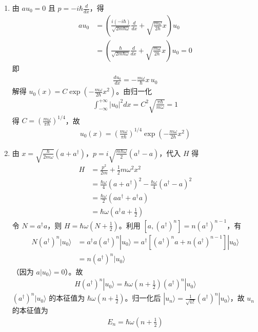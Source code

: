 \begin{enumerate}
{\begin{enumerate}
		\item 由 $a u_0=0$ 且 $p=-i\hbar\frac{d}{dx}$，得
		\begin{align*}
			a u_0&=\left(\frac{i(-i\hbar)}{\sqrt{2m\hbar\omega}}\frac{d}{dx}+\sqrt{\frac{m\omega}{2\hbar}}x\right)u_0\\
			&=\left(\frac{\hbar}{\sqrt{2m\hbar\omega}}\frac{d}{dx}+\sqrt{\frac{m\omega}{2\hbar}}x\right)u_0=0
		\end{align*}
		即
		\begin{align*}
			\frac{du_0}{dx}=-\frac{m\omega}{\hbar}x\,u_0
		\end{align*}
		解得 $u_0(x)=C\exp\!\left(-\frac{m\omega}{2\hbar}x^2\right)$。由归一化
		\begin{align*}
			\int_{-\infty}^{+\infty}|u_0|^2dx=C^2\sqrt{\frac{\pi\hbar}{m\omega}}=1
		\end{align*}
		得 $C=\left(\frac{m\omega}{\pi\hbar}\right)^{1/4}$，故
		\begin{align*}
			u_0(x)=\left(\frac{m\omega}{\pi\hbar}\right)^{1/4}\exp\!\left(-\frac{m\omega}{2\hbar}x^2\right)
		\end{align*}
		
		\item 由 $x=\sqrt{\frac{\hbar}{2m\omega}}(a+a^{\dagger})$，$p=i\sqrt{\frac{m\hbar\omega}{2}}(a^{\dagger}-a)$，代入 $H$ 得
		\begin{align*}
			H&=\frac{p^2}{2m}+\frac{1}{2}m\omega^2x^2\\
			&=\frac{\hbar\omega}{4}(a+a^{\dagger})^2-\frac{\hbar\omega}{4}(a^{\dagger}-a)^2\\
			&=\frac{\hbar\omega}{2}(aa^{\dagger}+a^{\dagger}a)\\
			&=\hbar\omega\left(a^{\dagger}a+\frac{1}{2}\right)
		\end{align*}
		令 $N=a^{\dagger}a$，则 $H=\hbar\omega(N+\frac{1}{2})$。利用 $[a,(a^{\dagger})^n]=n(a^{\dagger})^{n-1}$，有
		\begin{align*}
			N(a^{\dagger})^n|u_0\rangle&=a^{\dagger}a(a^{\dagger})^n|u_0\rangle=a^{\dagger}[(a^{\dagger})^na+n(a^{\dagger})^{n-1}]|u_0\rangle\\
			&=n(a^{\dagger})^n|u_0\rangle
		\end{align*}
		（因为 $a|u_0\rangle=0$）。故
		\begin{align*}
			H(a^{\dagger})^n|u_0\rangle=\hbar\omega\left(n+\frac{1}{2}\right)(a^{\dagger})^n|u_0\rangle
		\end{align*}
		$(a^{\dagger})^n|u_0\rangle$ 的本征值为 $\hbar\omega(n+\frac{1}{2})$。归一化后 $|u_n\rangle=\frac{1}{\sqrt{n!}}(a^{\dagger})^n|u_0\rangle$，故 $u_n$ 的本征值为
		\begin{align*}
			E_n=\hbar\omega\left(n+\frac{1}{2}\right)
		\end{align*}
		

\end{enumerate}}
\end{enumerate}
